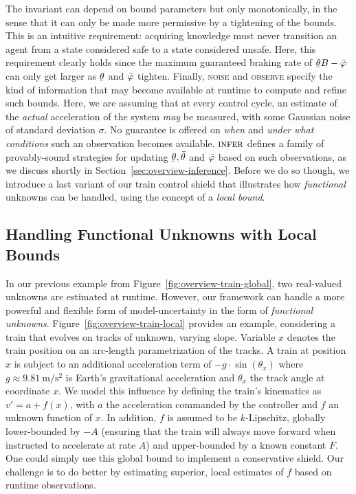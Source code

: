 \documentclass[acmsmall,screen,nonacm]{acmart}
\begin{document}
The invariant can depend on bound parameters but only monotonically, in the sense that it can only be made more permissive by a tightening of the bounds. This is an intuitive requirement: acquiring knowledge must never transition an agent from a state considered safe to a state considered unsafe. Here, this requirement clearly holds since the maximum guaranteed braking rate of $\TrainThetaBrakingRate$ can only get larger as $\TrainThetaSlopeMin$ and $\bar{\varphi}$ tighten. Finally, \textsc{noise} and \textsc{observe} specify the kind of information that may become available at runtime to compute and refine such bounds. Here, we are assuming that at every control cycle, an estimate of the \emph{actual} acceleration of the system \emph{may} be measured, with some Gaussian noise of standard deviation $\sigma$. No guarantee is offered on \emph{when} and \emph{under what conditions} such an observation becomes available. $\textsc{infer}$ defines a family of provably-sound strategies for updating $\TrainThetaSlopeMin, \TrainThetaSlopeMax$ and $\bar{\varphi}$ based on such observations, as we discuss shortly in Section~\ref{sec:overview-inference}.
Before we do so though, we introduce a last variant of our train control shield that illustrates how \emph{functional} unknowns can be handled, using the concept of a \emph{local bound}.







\subsection{Handling Functional Unknowns with Local Bounds}\label{sec:overview-train-local}

In our previous example from Figure~\ref{fig:overview-train-global}, two real-valued unknowns are estimated at runtime. However, our framework can handle a more powerful and flexible form of model-uncertainty in the form of \emph{functional unknowns}. Figure~\ref{fig:overview-train-local} provides an example, considering a train that evolves on tracks of unknown, varying slope. Variable $x$ denotes the train position on an arc-length parametrization of the tracks. A train at position $x$ is subject to an additional acceleration term of $-g\cdot\sin(\theta_x)$ where $g \approx \qty{9.81}{\metre\per\s\squared}$ is Earth's gravitational acceleration and $\theta_x$ the track angle at coordinate $x$. We model this influence by defining the train's kinematics as $v' = a + f(x)$, with $a$ the acceleration commanded by the controller and $f$ an unknown function of $x$. In addition, $f$ is assumed to be $k$-Lipschitz, globally lower-bounded by $-A$ (ensuring that the train will always move forward when instructed to accelerate at rate $A$) and upper-bounded by a known constant $F$. One could simply use this global bound to implement a conservative shield. Our challenge is to do better by estimating superior, local estimates of $f$ based on runtime observations.
\end{document}
